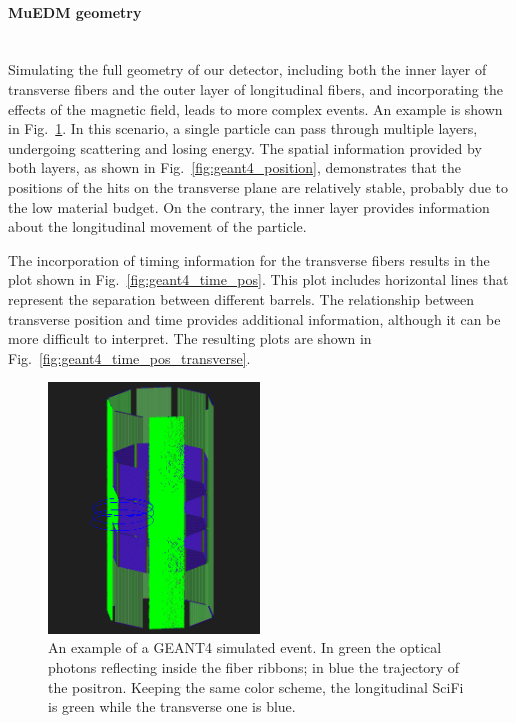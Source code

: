 \begin{refsection}
\vspace{2mm}
\paragraph{MuEDM geometry}~\\

Simulating the full geometry of our detector, including both the inner layer of transverse fibers and the outer layer of longitudinal fibers, and incorporating the effects of the magnetic field, leads to more complex events. An example is shown in Fig.~\ref{fig:geant4_B}. In this scenario, a single particle can pass through multiple layers, undergoing scattering and losing energy. The spatial information provided by both layers, as shown in Fig.~\ref{fig:geant4_position}, demonstrates that the positions of the hits on the transverse plane are relatively stable, probably due to the low material budget. On the contrary, the inner layer provides information about the longitudinal movement of the particle.

The incorporation of timing information for the transverse fibers results in the plot shown in Fig.~\ref{fig:geant4_time_pos}. This plot includes horizontal lines that represent the separation between different barrels. The relationship between transverse position and time provides additional information, although it can be more difficult to interpret. The resulting plots are shown in Fig.~\ref{fig:geant4_time_pos_transverse}.

\begin{figure}
    \centering
    \includegraphics[width=0.5\textwidth]{Figures/muEDM/Tracker/muedm_scifi_B.png}
    \caption{An example of a \textsc{GEANT4} simulated event. In green the optical photons reflecting inside the fiber ribbons; in blue the trajectory of the positron. Keeping the same color scheme, the longitudinal SciFi is green while the transverse one is blue.
    }
    \label{fig:geant4_B}
\end{figure}


\end{refsection}
